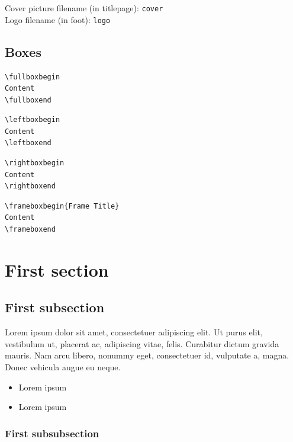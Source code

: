\documentclass[12pt]{article}
\begin{document}
\noindent
Cover picture filename (in titlepage): \texttt{cover}\\
Logo filename (in foot): \texttt{logo}

\subsection{Boxes}

\begin{verbatim}
\fullboxbegin
Content
\fullboxend
\end{verbatim}

\begin{verbatim}
\leftboxbegin
Content
\leftboxend
\end{verbatim}

\begin{verbatim}
\rightboxbegin
Content
\rightboxend
\end{verbatim}

\begin{verbatim}
\frameboxbegin{Frame Title}
Content
\frameboxend
\end{verbatim}

\newpage

\section{First section}
\lipsum[1]

\fullboxbegin
\lipsum[1]
\fullboxend

\lipsum[1]

\subsection{First subsection}
\lipsum[1]

\leftboxbegin
Lorem ipsum dolor sit amet, consectetuer adipiscing elit. Ut purus elit, vestibulum ut, placerat ac, adipiscing vitae, felis. Curabitur dictum gravida mauris. Nam arcu libero, nonummy eget, consectetuer id, vulputate a, magna. Donec vehicula augue eu neque. 
\leftboxend

\lipsum[1-2]

\rightboxbegin
\begin{itemize}
 \item Lorem ipsum
 \item Lorem ipsum
\end{itemize}
\rightboxend

\lipsum[1]

\subsubsection{First subsubsection}
\end{document}

